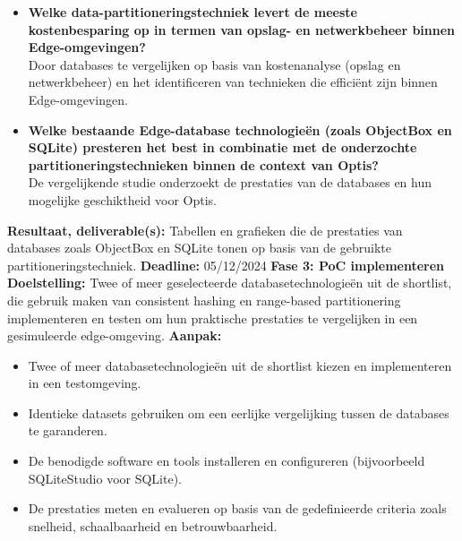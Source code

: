     \begin{itemize}
    \item \textbf{Welke data-partitioneringstechniek levert de meeste kostenbesparing op in termen van opslag- en netwerkbeheer binnen Edge-omgevingen?} \\
      Door databases te vergelijken op basis van kostenanalyse (opslag en netwerkbeheer) en het identificeren van technieken die efficiënt zijn binnen Edge-omgevingen.
    \item \textbf{Welke bestaande Edge-database technologieën (zoals ObjectBox en SQLite) presteren het best in combinatie met de onderzochte partitioneringstechnieken binnen de context van Optis?} \\
      De vergelijkende studie onderzoekt de prestaties van de databases en hun mogelijke geschiktheid voor Optis.
    \end{itemize}
    \textbf{Resultaat, deliverable(s):} Tabellen en grafieken die de prestaties van databases zoals ObjectBox en SQLite tonen op basis van de gebruikte partitioneringstechniek.\newline\newline
    \textbf{Deadline:} 05/12/2024\newline\newline
\textbf{Fase 3: PoC implementeren}\newline\newline
    \textbf{Doelstelling:} Twee of meer geselecteerde databasetechnologieën uit de shortlist, die gebruik maken van consistent hashing en range-based partitionering implementeren en testen om hun praktische prestaties te vergelijken in een gesimuleerde edge-omgeving.\newline\newline
    \textbf{Aanpak:}
    \begin{itemize}
        \item Twee of meer databasetechnologieën uit de shortlist kiezen en implementeren in een testomgeving.
        \item Identieke datasets gebruiken om een eerlijke vergelijking tussen de databases te garanderen.
        \item De benodigde software en tools installeren en configureren (bijvoorbeeld SQLiteStudio voor SQLite).
        \item De prestaties meten en evalueren op basis van de gedefinieerde criteria zoals snelheid, schaalbaarheid en betrouwbaarheid.\\ \\
    \end{itemize}
